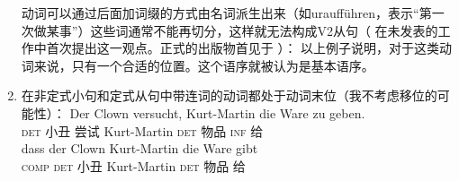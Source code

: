 \begin{enumerate}
动词可以通过后面加词缀的方式由名词派生出来（如uraufführen，表示“第一次做某事”）这些词通常不能再切分，这样就无法构成V2从句（ \citet{Hoehle91b}在未发表的工作中首次提出这一观点。正式的出版物首见于 ）：
\eal
{}
\zl
以上例子说明，对于这类动词来说，只有一个合适的位置。这个语序就被认为是基本语序。
\item 在非定式小句和定式从句中带连词的动词都处于动词末位（我不考虑移位的可能性）：
\eal
\ex 
\gll Der Clown versucht, Kurt-Martin die Ware zu geben.\\
     \textsc{det} 小丑 尝试 Kurt-Martin \textsc{det} 物品 \textsc{inf} 给\\
\ex 
\gll dass der Clown Kurt-Martin die Ware gibt\\
	 \textsc{comp} \textsc{det} 小丑 Kurt-Martin \textsc{det} 物品 给\\
\zl


\end{enumerate}
